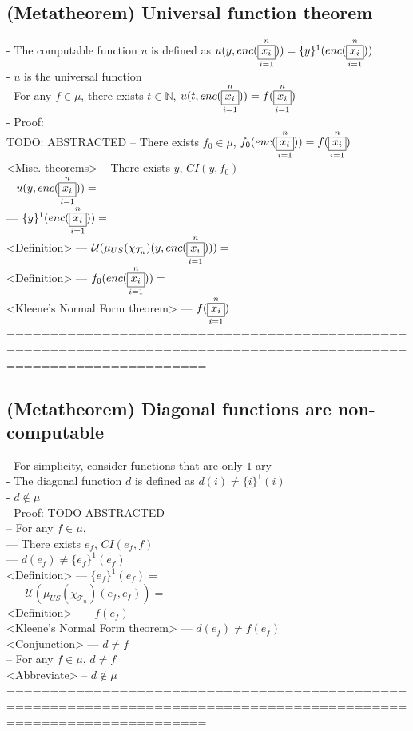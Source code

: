 \documentclass{book}
\newcommand{\inot}{\not}
\newcommand{\vdc}[3]{\underset{#2}{\overset{#3}{\fbox{$#1$}}}}
\begin{document}
\subsection{(Metatheorem) Universal function theorem} %
	- The computable function $u$ is defined as $u(y, enc(\vdc{x_i}{i=1}{n})) = \{y\}^1(enc(\vdc{x_i}{i=1}{n}))$ \\
	- $u$ is the universal function \\
	- For any $f \in \mu$, there exists $t \in \mathbb{N}$, $u(t, enc(\vdc{x_i}{i=1}{n})) = f(\vdc{x_i}{i=1}{n})$ \\
	- Proof: \\ TODO: ABSTRACTED
		-- There exists $f_0 \in \mu$, $f_0(enc(\vdc{x_i}{i=1}{n})) = f(\vdc{x_i}{i=1}{n})$ \\ <Misc. theorems>
		-- There exists $y$, $CI(y, f_0)$ \\
		-- $u(y, enc(\vdc{x_i}{i=1}{n})) = $ \\
			--- $\{y\}^1(enc(\vdc{x_i}{i=1}{n})) = $ \\ <Definition>
			--- $\mathcal{U}(\mu_{US}(\chi_{\mathcal{T}_n})(y, enc(\vdc{x_i}{i=1}{n}))) = $ \\ <Definition>
			--- $f_0(enc(\vdc{x_i}{i=1}{n})) = $ \\ <Kleene's Normal Form theorem>
			--- $f(\vdc{x_i}{i=1}{n})$ \\
	===================================================================================================================
\subsection{(Metatheorem) Diagonal functions are non-computable} %
	- For simplicity, consider functions that are only $1$-ary \\
	- The diagonal function $d$ is defined as $d(i) \inot = \{i\}^1(i)$ \\
	- $d \inot \in \mu$ \\
	- Proof: TODO ABSTRACTED \\
		-- For any $f \in \mu$, \\
			--- There exists $e_f$, $CI(e_f, f)$ \\
			--- $d(e_f) \inot = \{e_f\}^1(e_f)$ \\ <Definition>
			--- $\{e_f\}^1(e_f) = $ \\
				---- $\mathcal{U}(\mu_{US}(\chi_{\mathcal{T}_n})(e_f, e_f)) = $ \\ <Definition>
				---- $f(e_f)$ \\ <Kleene's Normal Form theorem>
			--- $d(e_f) \inot = f(e_f)$ \\ <Conjunction>
			--- $d \inot = f$ \\
		-- For any $f \in \mu$, $d \inot = f$ \\ <Abbreviate>
		-- $d \inot \in \mu$ \\
	===================================================================================================================
\end{document}
